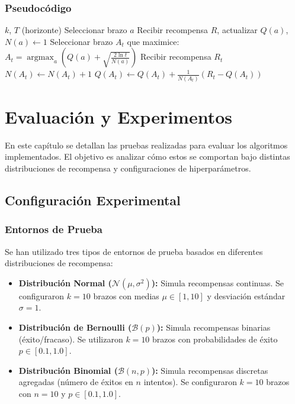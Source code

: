 \subsubsection{Pseudocódigo}
\begin{algorithm}[H]
\caption{Algoritmo UCB1}
\begin{algorithmic}[1]
\small
\Require $k$, $T$ (horizonte)
\State {}
    \State Seleccionar brazo $a$
    \State Recibir recompensa $R$, actualizar $Q(a)$, $N(a) \gets 1$
\EndFor
\State {}
    \State Seleccionar brazo $A_t$ que maximice:
    \State \quad $A_t = \operatorname{argmax}_a \left( Q(a) + \sqrt{\frac{2 \ln t}{N(a)}} \right)$
    \State Recibir recompensa $R_t$
    \State $N(A_t) \gets N(A_t) + 1$
    \State $Q(A_t) \gets Q(A_t) + \frac{1}{N(A_t)} (R_t - Q(A_t))$
\EndFor
\end{algorithmic}
\end{algorithm}
\section{Evaluación y Experimentos}

En este capítulo se detallan las pruebas realizadas para evaluar los 
algoritmos implementados. El objetivo es analizar cómo estos se comportan 
bajo distintas distribuciones de recompensa y configuraciones de hiperparámetros.

\subsection{Configuración Experimental}

\subsubsection{Entornos de Prueba}
Se han utilizado tres tipos de entornos de prueba basados en diferentes distribuciones de 
recompensa:
\begin{itemize}
    \item \textbf{Distribución Normal ($\mathcal{N}(\mu, \sigma^2)$):} Simula recompensas continuas. Se configuraron $k=10$ brazos con medias $\mu \in [1, 10]$ y desviación estándar $\sigma=1$.
    \item \textbf{Distribución de Bernoulli ($\mathcal{B}(p)$):} Simula recompensas binarias (éxito/fracaso). Se utilizaron $k=10$ brazos con probabilidades de éxito $p \in [0.1, 1.0]$.
    \item \textbf{Distribución Binomial ($\mathcal{B}(n, p)$):} Simula recompensas discretas agregadas (número de éxitos en $n$ intentos). Se configuraron $k=10$ brazos con $n=10$ y $p \in [0.1, 1.0]$.
\end{itemize}

